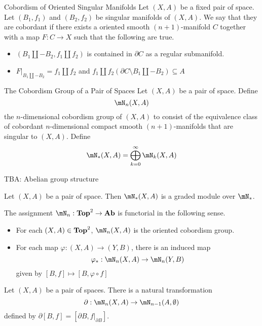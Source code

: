\documentclass[a4paper]{article}
\begin{document}
\begin{defn}{Cobordism of Oriented Singular Manifolds}{} Let $(X,A)$ be a fixed pair of space. Let $(B_1,f_1)$ and $(B_2,f_2)$ be singular manifolds of $(X,A)$. We say that they are cobordant if there exists a oriented smooth $(n+1)$-manifold $C$ together with a map $F:C\to X$ such that the following are true. 
\begin{itemize}
\item $(B_1\coprod-B_2,f_1\coprod f_2)$ is contained in $\partial C$ as a regular submanifold.
\item $F|_{B_1\coprod-B_2}=f_1\coprod f_2$ and $f_1\coprod f_2(\partial C\setminus B_1\coprod-B_2)\subseteq A$
\end{itemize}
\end{defn}

\begin{defn}{The Cobordism Group of a Pair of Spaces}{} Let $(X,A)$ be a pair of space. Define $$\mN_n(X,A)$$ the $n$-dimensional cobordism group of $(X,A)$ to consist of the equivalence class of cobordant $n$-dimensional compact smooth $(n+1)$-manifolds that are singular to $(X,A)$. Define $$\mN_\ast(X,A)=\bigoplus_{k=0}^\infty\mN_k(X,A)$$
\end{defn}

TBA: Abelian group structure

\begin{prp}{}{} Let $(X,A)$ be a pair of space. Then $\mN_\ast(X,A)$ is a graded module over $\mN_\ast$. 
\end{prp}

\begin{thm}{}{} The assignment $\mN_n:\bold{Top}^2\to\bold{Ab}$ is functorial in the following sense. 
\begin{itemize}
\item For each $(X,A)\in\bold{Top}^2$, $\mN_n(X,A)$ is the oriented cobordism group. 
\item For each map $\varphi:(X,A)\to(Y,B)$, there is an induced map $$\varphi_\ast:\mN_n(X,A)\to\mN_n(Y,B)$$ given by $[B,f]\mapsto[B,\varphi\circ f]$
\end{itemize}
\end{thm}

\begin{thm}{}{} Let $(X,A)$ be a pair of spaces. There is a natural transformation $$\partial:\mN_n(X,A)\to\mN_{n-1}(A,\emptyset)$$ defined by $\partial[B,f]=[\partial B,f|_{\partial B}]$. 
\end{thm}
\end{document}
